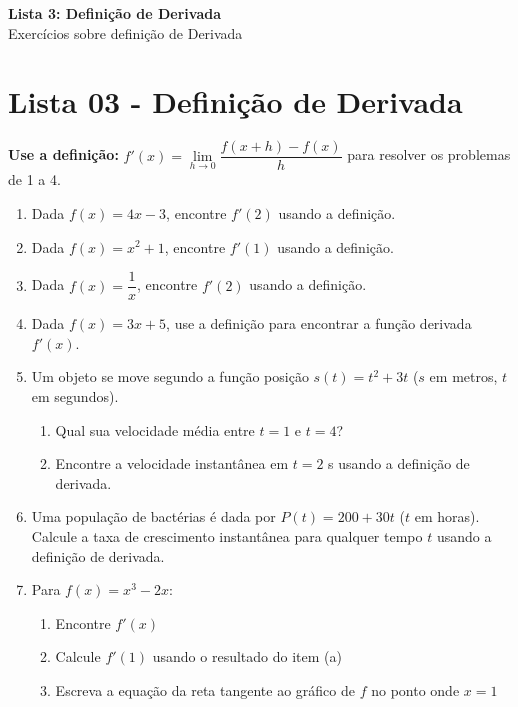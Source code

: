 \documentclass[12pt,a4paper]{article}
\begin{document}
\begin{center}
  {\LARGE\bfseries\color{primary} Lista 3: Definição de Derivada} \\[0.1cm]
  {\small\sffamily\color{gray} Exercícios sobre definição de Derivada}
\end{center}

\vspace{0.2cm}


\section*{Lista 03 - Definição de Derivada}



\textbf{Use a definição:} \( f'(x) = \lim\limits_{h \to 0} \dfrac{f(x+h) - f(x)}{h} \) para resolver os problemas de 1 a 4.\\[0.5cm]

\begin{enumerate}
    \item  Dada \( f(x) = 4x - 3 \), encontre \( f'(2) \) usando a definição.
    
    \item  Dada \( f(x) = x^2 + 1 \), encontre \( f'(1) \) usando a definição.
    
    \item  Dada \( f(x) = \dfrac{1}{x} \), encontre \( f'(2) \) usando a definição.
    
    \item  Dada \( f(x) = 3x + 5 \), use a definição para encontrar a função derivada \( f'(x) \).
    \item  Um objeto se move segundo a função posição \( s(t) = t^2 + 3t \) (\( s \) em metros, \( t \) em segundos).
    
    \begin{enumerate}
        \item Qual sua velocidade média entre \( t = 1 \) e \( t = 4 \)?
        \item Encontre a velocidade instantânea em \( t = 2 \) s usando a definição de derivada.
    \end{enumerate}

    \item Uma população de bactérias é dada por \( P(t) = 200 + 30t \) (\( t \) em horas).
    Calcule a taxa de crescimento instantânea para qualquer tempo \( t \) usando a definição de derivada.

    \item Para \( f(x) = x^3 - 2x \):
    \begin{enumerate}
        \item Encontre \( f'(x) \)
        \item Calcule \( f'(1) \) usando o resultado do item (a)
        \item Escreva a equação da reta tangente ao gráfico de \( f \) no ponto onde \( x = 1 \)
    \end{enumerate}

  \end{enumerate}

  
\end{document}
